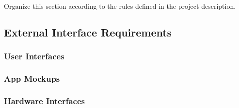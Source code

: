 Organize this section according to the rules defined in the project description. 
\subsection{External Interface Requirements}



\subsubsection{User Interfaces}
\subsubsection{App Mockups}

\subsubsection{Hardware Interfaces}
